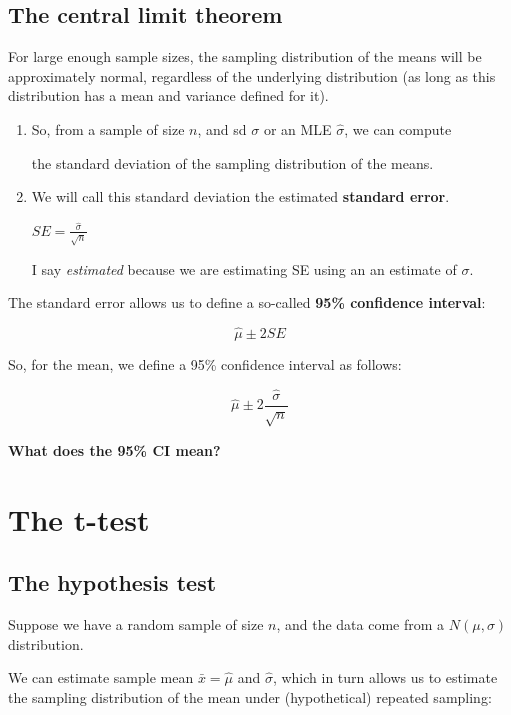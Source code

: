 \documentclass[12pt]{article}
\begin{document}
\subsection{The central limit theorem}

For large enough sample sizes, the sampling distribution of the means will be approximately normal, regardless of the underlying distribution (as long as this distribution has a mean and variance defined for it).

\begin{enumerate}
\item
So, from a sample of size $n$, and sd $\sigma$ or an MLE $\hat\sigma$, we can compute 

the standard deviation of the sampling distribution of the means.
\item We will call this standard deviation the estimated \textbf{standard error}.

$SE = \frac{\hat\sigma}{\sqrt{n}}$

I say \textit{estimated} because we are estimating SE using an an estimate of $\sigma$.

\end{enumerate}

The standard error allows us to define a so-called \textbf{95\% confidence interval}:

\begin{equation}
\hat\mu \pm 2 SE
\end{equation}

So, for the mean, we define a 95\% confidence interval as follows:

\begin{equation}
\hat\mu \pm 2 \frac{\hat\sigma}{\sqrt{n}}
\end{equation}

\textbf{What does the 95\% CI mean?}

\section{The t-test}

\subsection{The hypothesis test}

Suppose we have a random sample of size $n$, and the data come from a $N(\mu,\sigma)$ distribution. 

We can estimate sample mean $\bar{x}=\hat \mu$ and $\hat\sigma$, which in turn allows us to estimate the sampling distribution of the mean under (hypothetical) repeated sampling:
\end{document}
